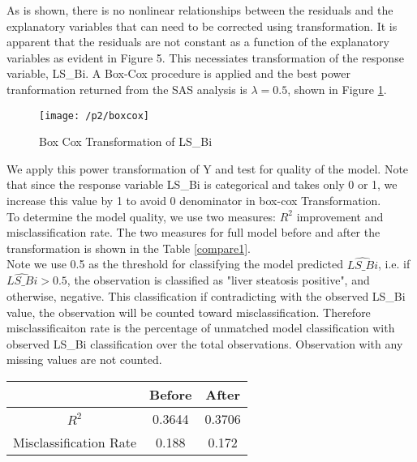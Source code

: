 \documentclass{article}
\begin{document}
As is shown, there is no nonlinear relationships between the residuals and the explanatory variables that can need to be corrected using transformation. It is apparent that the residuals are not constant as a function of the explanatory variables as evident in Figure 5. This necessiates transformation of the response variable, LS\_Bi. A Box-Cox procedure is applied and the best power tranformation returned from the SAS analysis is $\lambda = 0.5$, shown in Figure \ref{boxcox}. \\

\begin{minipage}{\textwidth}		
\begin{figure}[H]
\centering
\texttt{[image: /p2/boxcox]}
\caption{Box Cox Transformation of LS\_Bi}
\label{boxcox}
\end{figure}
\end{minipage} \hfill


We apply this power transformation of Y and test for quality of the model. Note that since the response variable LS\_Bi is categorical and takes only 0 or 1, we increase this value by 1 to avoid 0 denominator in box-cox Transformation. \\

To determine the model quality, we use two measures: $R^2$ improvement and misclassification rate. The two measures for full model before and after the transformation is shown in the Table \ref{compare1}. \\

Note we use 0.5 as the threshold for classifying the model predicted $\hat{LS\_Bi}$, i.e. if $\hat{LS\_Bi} > 0.5$, the observation is classified as "liver steatosis positive", and otherwise, negative. This classification if contradicting with the observed LS\_Bi value, the observation will be counted toward misclassification. Therefore misclassificaiton rate is the percentage of unmatched model classification with observed LS\_Bi classification over the total observations. Observation with any missing values are not counted.\\


\begin{minipage}{\textwidth}
\centering
{} \label{compare1}
	\begin{tabular}{c | c | c}
	\hline
	& Before & After\\
	\hline
	$R^2$ & 0.3644 & 0.3706 \\
	\hline
	Misclassification Rate & 0.188 & 0.172\\
	\hline
	\end{tabular}
\end{minipage} \hfill
\end{document}
